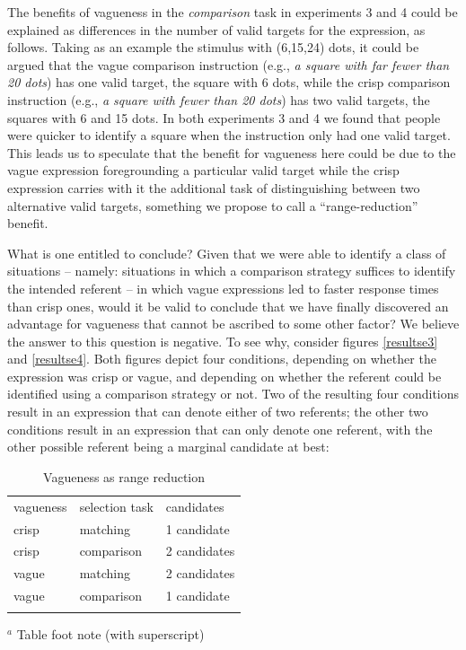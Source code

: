 The benefits of vagueness in the \emph{comparison} task in experiments 3 and 4 could be explained as differences in the number of valid targets for the expression, as follows. Taking as an example the stimulus with (6,15,24) dots, it could be argued that the vague comparison instruction (e.g., \emph{a square with far fewer than 20 dots}) has one valid target, the square with 6 dots, while the crisp comparison instruction (e.g., \emph{a square with fewer than 20 dots}) has two valid targets, the squares with 6 and 15 dots. In both experiments 3 and 4 we found that people were quicker to identify a square when the instruction only had one valid target. This leads us to speculate that the benefit for vagueness here could be due to the vague expression foregrounding a particular valid target while the crisp expression carries with it the additional task of distinguishing between two alternative valid targets, something we propose to call a ``range-reduction'' benefit.

What is one entitled to conclude? Given that we were able to identify a class of situations -- namely: situations in which a comparison strategy suffices to identify the intended referent -- in which vague expressions led to faster response times than crisp ones, would it be valid to conclude that we have finally discovered an advantage for vagueness that cannot be ascribed to some other factor? We believe the answer to this question is negative. To see why, consider figures \ref{resultse3} and \ref{resultse4}. Both figures depict four conditions, depending on whether the expression was crisp or vague, and depending on whether the referent could be identified using a comparison strategy or not. Two of the resulting four conditions result in an expression that can denote either of two referents; the other two conditions result in an expression that can only denote one referent, with the other possible referent being a marginal candidate at best:


\begin{table}
\caption{Vagueness as range reduction}
\label{vaguenessasrangereduction} 
\begin{tabular}{lll}
\hline\noalign{\smallskip}
vagueness & selection task & candidates\\
\noalign{\smallskip}\svhline\noalign{\smallskip}
crisp & matching & 1 candidate\\
crisp & comparison & 2 candidates\\
vague & matching & 2 candidates\\
vague & comparison & 1 candidate\\
\noalign{\smallskip}\hline\noalign{\smallskip}
\end{tabular}
$^a$ Table foot note (with superscript)\\
\end{table}


